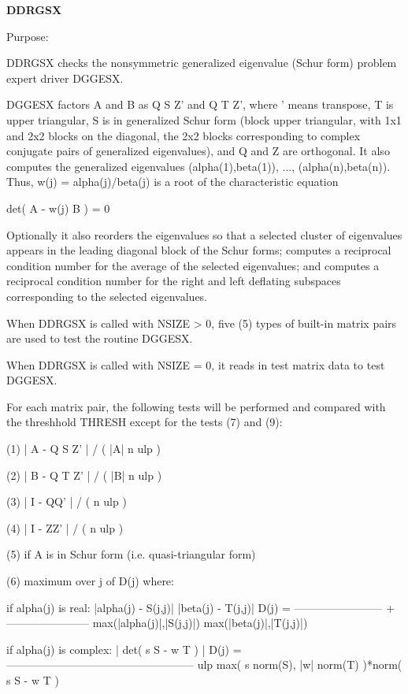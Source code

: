 {\bfseries D\+D\+R\+G\+S\+X} 

\begin{DoxyParagraph}{Purpose\+: }
\begin{DoxyVerb} DDRGSX checks the nonsymmetric generalized eigenvalue (Schur form)
 problem expert driver DGGESX.

 DGGESX factors A and B as Q S Z' and Q T Z', where ' means
 transpose, T is upper triangular, S is in generalized Schur form
 (block upper triangular, with 1x1 and 2x2 blocks on the diagonal,
 the 2x2 blocks corresponding to complex conjugate pairs of
 generalized eigenvalues), and Q and Z are orthogonal.  It also
 computes the generalized eigenvalues (alpha(1),beta(1)), ...,
 (alpha(n),beta(n)). Thus, w(j) = alpha(j)/beta(j) is a root of the
 characteristic equation

     det( A - w(j) B ) = 0

 Optionally it also reorders the eigenvalues so that a selected
 cluster of eigenvalues appears in the leading diagonal block of the
 Schur forms; computes a reciprocal condition number for the average
 of the selected eigenvalues; and computes a reciprocal condition
 number for the right and left deflating subspaces corresponding to
 the selected eigenvalues.

 When DDRGSX is called with NSIZE > 0, five (5) types of built-in
 matrix pairs are used to test the routine DGGESX.

 When DDRGSX is called with NSIZE = 0, it reads in test matrix data
 to test DGGESX.

 For each matrix pair, the following tests will be performed and
 compared with the threshhold THRESH except for the tests (7) and (9):

 (1)   | A - Q S Z' | / ( |A| n ulp )

 (2)   | B - Q T Z' | / ( |B| n ulp )

 (3)   | I - QQ' | / ( n ulp )

 (4)   | I - ZZ' | / ( n ulp )

 (5)   if A is in Schur form (i.e. quasi-triangular form)

 (6)   maximum over j of D(j)  where:

       if alpha(j) is real:
                     |alpha(j) - S(j,j)|        |beta(j) - T(j,j)|
           D(j) = ------------------------ + -----------------------
                  max(|alpha(j)|,|S(j,j)|)   max(|beta(j)|,|T(j,j)|)

       if alpha(j) is complex:
                                 | det( s S - w T ) |
           D(j) = ---------------------------------------------------
                  ulp max( s norm(S), |w| norm(T) )*norm( s S - w T )


\end{DoxyVerb}
\end{DoxyParagraph}

